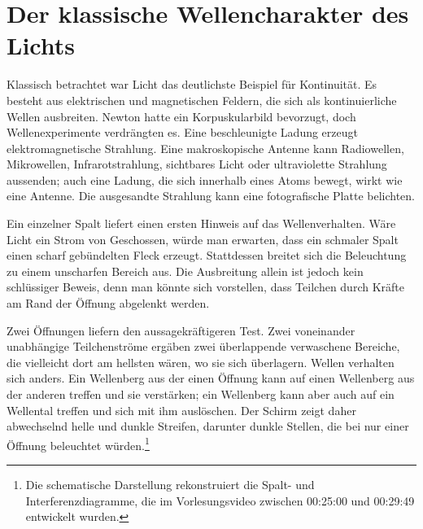 \section{Der klassische Wellencharakter des Lichts}

Klassisch betrachtet war Licht das deutlichste Beispiel für Kontinuität. Es besteht aus elektrischen und magnetischen Feldern, die sich als kontinuierliche Wellen ausbreiten. Newton hatte ein Korpuskularbild bevorzugt, doch Wellenexperimente verdrängten es. Eine beschleunigte Ladung erzeugt elektromagnetische Strahlung. Eine makroskopische Antenne kann Radiowellen, Mikrowellen, Infrarotstrahlung, sichtbares Licht oder ultraviolette Strahlung aussenden; auch eine Ladung, die sich innerhalb eines Atoms bewegt, wirkt wie eine Antenne. Die ausgesandte Strahlung kann eine fotografische Platte belichten.

Ein einzelner Spalt liefert einen ersten Hinweis auf das Wellenverhalten. Wäre Licht ein Strom von Geschossen, würde man erwarten, dass ein schmaler Spalt einen scharf gebündelten Fleck erzeugt. Stattdessen breitet sich die Beleuchtung zu einem unscharfen Bereich aus. Die Ausbreitung allein ist jedoch kein schlüssiger Beweis, denn man könnte sich vorstellen, dass Teilchen durch Kräfte am Rand der Öffnung abgelenkt werden.

Zwei Öffnungen liefern den aussagekräftigeren Test. Zwei voneinander unabhängige Teilchenströme ergäben zwei überlappende verwaschene Bereiche, die vielleicht dort am hellsten wären, wo sie sich überlagern. Wellen verhalten sich anders. Ein Wellenberg aus der einen Öffnung kann auf einen Wellenberg aus der anderen treffen und sie verstärken; ein Wellenberg kann aber auch auf ein Wellental treffen und sich mit ihm auslöschen. Der Schirm zeigt daher abwechselnd helle und dunkle Streifen, darunter dunkle Stellen, die bei nur einer Öffnung beleuchtet würden.\footnote{Die schematische Darstellung rekonstruiert die Spalt- und Interferenzdiagramme, die im Vorlesungsvideo zwischen 00:25:00 und 00:29:49 entwickelt wurden.}

